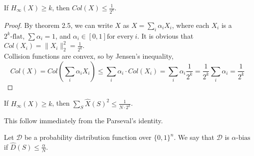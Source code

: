 \begin{theorem}
If $H_\infty(X) \geq k$, then $Col(X) \leq \frac{1}{2^k}$.
\end{theorem}

\begin{proof}
By theorem 2.5, we can write $X$ as $X = \sum\limits_i \alpha_i X_i$, where each $X_i$ is a $2^k\text{-flat}$, $\sum \alpha_i = 1$, and $\alpha_i \in [0,1] \text{for every} \ i$. It is obvious that $Col(X_i) = \| X_i \|_2^2 = \frac{1}{2^k}$.\\
Collision functions are convex, so by Jensen's inequality, 
$$Col(X) = Col \left( \sum\limits_i \alpha_i X_i \right)
\leq \sum\limits_i \alpha_i \cdot Col(X_i)
= \sum\limits_i \alpha_i \frac{1}{2^k} 
=\frac{1}{2^k} \sum\limits_i \alpha_i 
= \frac{1}{2^k}$$
\end{proof}

\begin{theorem}
If $H_\infty(X) \geq k$, then $\sum\limits_{S} \widehat{X}(S)^2 \leq \frac{1}{N \cdot 2^k}$.
\end{theorem}

This follow immediately from the Parseval's identity.

\begin{definition}
Let $\mathcal{D}$ be a probability distribution function over $\{ 0,1 \}^n$.
We say that $\mathcal{D}$ is $\alpha\text{-bias}$ if $\widehat{D}(S) \leq \frac{\alpha}{N}$. \\
\end{definition}



